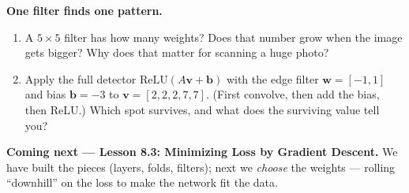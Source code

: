 \documentclass[10pt]{article}
\newcommand{\vv}{\mathbf{v}}
\newcommand{\bb}{\mathbf{b}}
\newcommand{\ww}{\mathbf{w}}
\newcommand{\relu}{\mathrm{ReLU}}
\begin{document}
\begin{extensionbox}
\textbf{One filter finds one pattern.}
\begin{enumerate}[label=(\alph*), leftmargin=1.8em, itemsep=5pt]
  \item A $5\times5$ filter has how many weights? Does that number grow when the image gets bigger? Why does
        that matter for scanning a huge photo?
  \item Apply the full detector $\relu(A\vv+\bb)$ with the edge filter $\ww=[-1,1]$ and bias $\bb=-3$ to
        $\vv=[2,2,2,7,7]$. (First convolve, then add the bias, then ReLU.) Which spot survives, and what does
        the surviving value tell you?
\end{enumerate}
\end{extensionbox}

\begin{spiralbox}
\textbf{Coming next --- Lesson 8.3: Minimizing Loss by Gradient Descent.} We have built the pieces (layers,
folds, filters); next we \emph{choose} the weights --- rolling ``downhill'' on the loss to make the network
fit the data.
\end{spiralbox}
\end{document}
